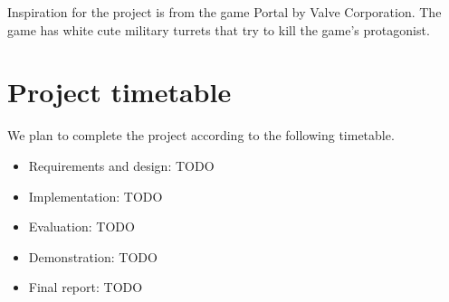 \documentclass[english,11pt,twoside,a4paper]{article}
\begin{document}
Inspiration for the project is from the game Portal by Valve Corporation. The game has white cute military turrets that try to kill the game's protagonist.

\section{Project timetable}

We plan to complete the project according to the following timetable.

\begin{itemize}
  \item Requirements and design: TODO
  \item Implementation: TODO
  \item Evaluation: TODO
  \item Demonstration: TODO
  \item Final report: TODO
\end{itemize}
\end{document}

